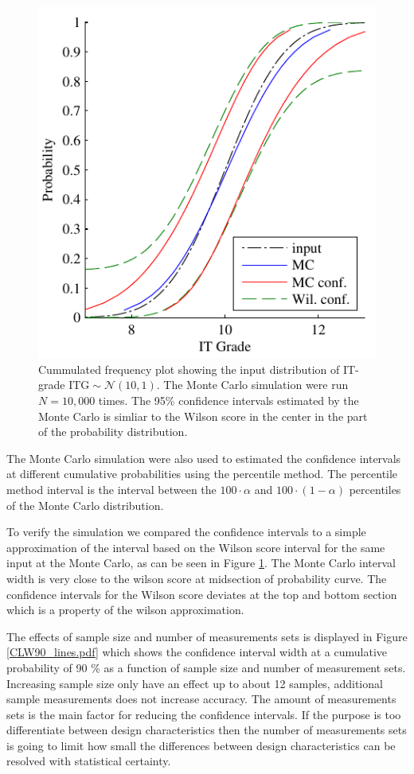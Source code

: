 \documentclass[aip,amsmath, reprint, author-year]{revtex4-1}
\begin{document}
\begin{figure}
\includegraphics{confidenceIntervals.pdf}
\caption{\label{fig:confidenceIntervals}Cummulated frequency plot showing the input distribution of IT-grade $\mathrm{ITG} \sim \mathcal{N} (10, 1)$. 
The Monte Carlo simulation were run $N = 10,000$ times. 
The 95\% confidence intervals estimated by the Monte Carlo is simliar to the Wilson score in the center in the part of the probability distribution.}
\end{figure}

The Monte Carlo simulation were also used to estimated the confidence intervals at different cumulative probabilities using the percentile method.
The percentile method interval is the interval between the $100 \cdot \alpha$ and $100 \cdot (1-\alpha)$ percentiles of the Monte Carlo distribution. 

To verify the simulation we compared the confidence intervals to a simple approximation of the interval based on the Wilson score interval for the same input at the Monte Carlo, as can be seen in Figure \ref{fig:confidenceIntervals}. The Monte Carlo interval width is very close to the wilson score at midsection of probability curve. 
The confidence intervals for the Wilson score deviates at the top and bottom section which is a property of the wilson approximation.

The effects of sample size and number of measurements sets is displayed in Figure \ref{CLW90_lines.pdf} which shows the confidence interval width at a cumulative probability of 90 \% as a function of sample size and number of measurement sets. 
Increasing sample size only have an effect up to about 12 samples, additional sample measurements does not increase accuracy. 
The amount of measurements sets is the main factor for reducing the confidence intervals. 
If the purpose is too differentiate between design characteristics then the number of measurements sets is going to limit how small the differences between design characteristics can be resolved with statistical certainty.
\end{document}

